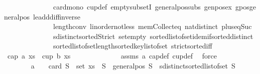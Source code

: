 \begin{isabellebody}
\ \ \ \ \ \ \ \ \ \ \ \ \ \ card{\isacharunderscore}{\kern0pt}mono\ cup{\isacharunderscore}{\kern0pt}def\ empty{\isacharunderscore}{\kern0pt}subsetI\ general{\isacharunderscore}{\kern0pt}pos{\isacharunderscore}{\kern0pt}subs\ genpos{\isacharunderscore}{\kern0pt}ex\ gpos{\isacharunderscore}{\kern0pt}generalpos\ le{\isacharunderscore}{\kern0pt}add{\isacharunderscore}{\kern0pt}diff{\isacharunderscore}{\kern0pt}inverse\isanewline
\ \ \ \ \ \ \ \ \ \ \ \ \ \ length{\isacharunderscore}{\kern0pt}{}{\isacharunderscore}{\kern0pt}conv\ linorder{\isacharunderscore}{\kern0pt}not{\isacharunderscore}{\kern0pt}less\ mem{\isacharunderscore}{\kern0pt}Collect{\isacharunderscore}{\kern0pt}eq\ nat{\isachardot}{\kern0pt}distinct{\isacharparenleft}{\kern0pt}{}{\isacharparenright}{\kern0pt}\ plus{\isacharunderscore}{\kern0pt}{}{\isacharunderscore}{\kern0pt}eq{\isacharunderscore}{\kern0pt}Suc\isanewline
\ \ \ \ \ \ \ \ \ \ \ \ \ \ sdistinct{\isacharunderscore}{\kern0pt}sortedStrict\ set{\isacharunderscore}{\kern0pt}empty{}\ sorted{\isacharunderscore}{\kern0pt}list{\isacharunderscore}{\kern0pt}of{\isacharunderscore}{\kern0pt}set{\isachardot}{\kern0pt}idem{\isacharunderscore}{\kern0pt}if{\isacharunderscore}{\kern0pt}sorted{\isacharunderscore}{\kern0pt}distinct\isanewline
\ \ \ \ \ \ \ \ \ \ \ \ \ \ sorted{\isacharunderscore}{\kern0pt}list{\isacharunderscore}{\kern0pt}of{\isacharunderscore}{\kern0pt}set{\isachardot}{\kern0pt}length{\isacharunderscore}{\kern0pt}sorted{\isacharunderscore}{\kern0pt}key{\isacharunderscore}{\kern0pt}list{\isacharunderscore}{\kern0pt}of{\isacharunderscore}{\kern0pt}set\ strict{\isacharunderscore}{\kern0pt}sorted{\isacharunderscore}{\kern0pt}iff{\isacharparenright}{\kern0pt}\isanewline
\ \ \ \ \ \ \ \ \isamarkupfalse%
\ {\isachardoublequoteopen}{\isasymnot}{\isacharparenleft}{\kern0pt}cap\ a\ xs\ {\isasymor}\ cup\ b\ xs{\isacharparenright}{\kern0pt}{\isachardoublequoteclose}\ \ \isanewline
\ \ \ \ \ \ \ \ \ \ \isamarkupfalse%
\ assms\ a{}\ cap{\isacharunderscore}{\kern0pt}def\ cup{\isacharunderscore}{\kern0pt}def\ \isamarkupfalse%
\ force\isanewline
\ \ \ \ \ \ \isakeywordONE{{\isacharbraceright}{\kern0pt}}\isamarkupfalse%
\isanewline
\ \ \ \ \ \ \isamarkupfalse%
\ {\isachardoublequoteopen}a\ {\isacharminus}{\kern0pt}\ {}\ {\isacharequal}{\kern0pt}\ card\ S\ {\isasymand}\ set\ xs\ {\isasymsubseteq}\ S\ {\isasymand}\ general{\isacharunderscore}{\kern0pt}pos\ S\ {\isasymand}\ sdistinct{\isacharparenleft}{\kern0pt}sorted{\isacharunderscore}{\kern0pt}list{\isacharunderscore}{\kern0pt}of{\isacharunderscore}{\kern0pt}set\ S{\isacharparenright}{\kern0pt}\ \isanewline

\end{isabellebody}
